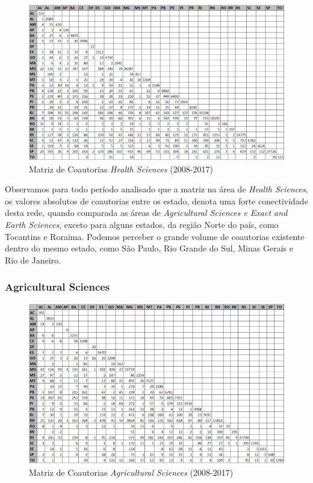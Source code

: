 \begin{figure}[H]
	\begin{adjustwidth}{-.6in}{-.6in}
		\centering
		\includegraphics[scale=0.6]{Imagens/health/matriz-uf.pdf}
		\caption{Matriz de Coautorias \textit{Health Sciences} (2008-2017)}
		\label{matriz-uf-agri}
	\end{adjustwidth}
\end{figure}

Observamos para todo período analisado que a matriz na área de \textit{Health Sciences}, os valores absolutos de coautorias entre os estado, denota uma forte conectividade desta rede, quando comparada as áreas de \textit{Agricultural Sciences e Exact and Earth Sciences}, exceto para alguns estados, da região Norte do país, como Tocantins e Roraima. Podemos perceber o grande volume de coautorias existente dentro do mesmo estado, como São Paulo, Rio Grande do Sul, Minas Gerais e Rio de Janeiro.

\subsubsection{Agricultural Sciences}

\begin{figure}[H]
	\begin{adjustwidth}{-.6in}{-.6in}
		\centering
		\includegraphics[scale=0.6]{Imagens/agricultural/matriz-uf.pdf}
		\caption{Matriz de Coautorias \textit{Agricultural Sciences} (2008-2017)}
		\label{matriz-uf-agri}
	\end{adjustwidth}
\end{figure}

